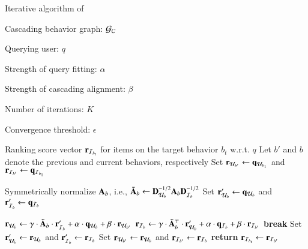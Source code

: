 \begin{algorithm}[t]
    \caption{Iterative algorithm of \method}
    \label{alg:method}
    \begin{algorithmic}[1]
        \small
        \Require 
        \item[] Cascading behavior graph: $\mathcal{G}_{\mathcal{C}}$
        \item[] Querying user: $q$
        \item[] Strength of query fitting: $\alpha$
        \item[] Strength of cascading alignment: $\beta$
        \item[] Number of iterations: $K$
        \item[] Convergence threshold: $\epsilon$
        \Ensure 
        \item[] Ranking score vector $\mathbf{r}_{\mathcal{I}_{b_t}}$ for items on the target behavior $b_t$ w.r.t. $q$
        \vspace{1mm} 
        \State Let $b'$ and $b$ denote the previous and current behaviors, respectively
        \State Set $\mathbf{r}_{\mathcal{U}_{b'}} \leftarrow \mathbf{q}_{\mathcal{U}_{b_1}}$ and $\mathbf{r}_{\mathcal{I}_{b'}} \leftarrow \mathbf{q}_{\mathcal{I}_{b_1}}$ \label{alg:method:init}{}
        
         \label{alg:method:outer:for}
            \State Symmetrically normalize $\mathbf{A}_{b}$, i.e., $\tilde{\mathbf{A}}_{b} \leftarrow \mathbf{D}_{\mathcal{U}_{b}}^{-1/2} \mathbf{A}_{b} \mathbf{D}_{\mathcal{I}_{b}}^{-1/2}$  \label{alg:method:norm}
            \State Set $\mathbf{r}_{\mathcal{U}_{b}}' \leftarrow \mathbf{q}_{\mathcal{U}_{b}}$ and $\mathbf{r}_{\mathcal{I}_{b}}' \leftarrow \mathbf{q}_{\mathcal{I}_{b}}$ {} 
            
             \label{alg:method:inner:for} {} 
            \label{alg:method:poweriteration}
                \State $\mathbf{r}_{\mathcal{U}_{b}} \leftarrow \gamma \cdot \tilde{\mathbf{A}}_{b} \cdot \mathbf{r}_{\mathcal{I}_{b}}' + \alpha\cdot\mathbf{q}_{\mathcal{U}_{b}} + \beta\cdot\mathbf{r}_{\mathcal{U}_{b'}}$ \label{alg:method:userscore}
                {} 
                \State $\mathbf{r}_{\mathcal{I}_{b}} \leftarrow \gamma \cdot\tilde{\mathbf{A}}_{b}^{\top} \cdot \mathbf{r}_{\mathcal{U}_{b}}'  + \alpha\cdot\mathbf{q}_{\mathcal{I}_{b}} + \beta\cdot\mathbf{r}_{\mathcal{I}_{b'}}$
                \label{alg:method:itemscore}
                 \label{alg:method:convergence}
                    \State \textbf{break}
                \EndIf
                \State Set $\mathbf{r}_{\mathcal{U}_{b}}' \leftarrow \mathbf{r}_{\mathcal{U}_{b}}$ and $\mathbf{r}_{\mathcal{I}_{b}}' \leftarrow \mathbf{r}_{\mathcal{I}_{b}}$ {} 
            \EndFor \label{alg:method:inner:forend}
            \State Set $\mathbf{r}_{\mathcal{U}_{b'}} \leftarrow \mathbf{r}_{\mathcal{U}_{b}}$ and $\mathbf{r}_{\mathcal{I}_{b'}} \leftarrow \mathbf{r}_{\mathcal{I}_{b}}$ \label{alg:method:update:next}
            {} 
        \EndFor \label{alg:method:outer:forend}
    \State \textbf{return} $\mathbf{r}_{\mathcal{I}_{b_t}} \leftarrow \mathbf{r}_{\mathcal{I}_{b'}}$ \label{alg:method:return}
    \end{algorithmic}
\end{algorithm}

